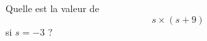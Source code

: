 
\begin{mental}
    
Quelle est la valeur de 
\begin{equation}
    s\times (s+9)
\end{equation}
si \( s=-3\) ?
\end{mental}

